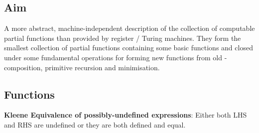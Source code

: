 \documentclass{article}
\newenvironment{definition}{\par\color{blue}}{\par}
\begin{document}
\subsection{Aim}
A more abstract, machine-independent description of the collection of computable partial functions than provided by register / Turing machines. They form the smallest collection of partial functions containing some basic functions and closed under some fundamental operations for forming new functions from old - composition, primitive recursion and minimisation.

\subsection{Functions}
\begin{definition}
\textbf{Kleene Equivalence of possibly-undefined expressions}: Either both LHS and RHS are undefined or they are both defined and equal.
\end{definition}
\end{document}
